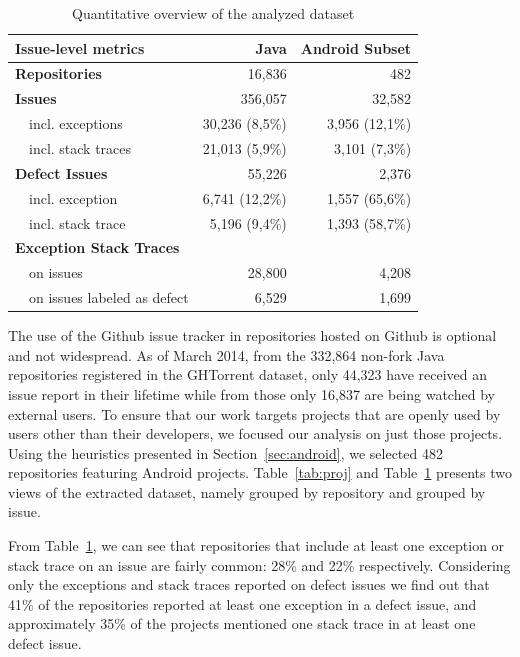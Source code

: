\documentclass[conference]{IEEEtran}
\begin{document}
\begin{table}
\centering
\begin{tabular}{p{1em}lrr}
\hline
\multicolumn{2}{l}{\bfseries{Issue-level metrics}} & \bfseries{Java} & \bfseries{Android Subset}\\
\hline
   \multicolumn{2}{l}{\bfseries{Repositories}} & 16,836 & 482\\
 \multicolumn{2}{l}{\bfseries{Issues}} & 356,057 & 32,582\\
    & incl. exceptions & 30,236 (8,5\%) & 3,956 (12,1\%) \\
    & incl. stack traces & 21,013 (5,9\%) & 3,101 (7,3\%) \\
 \multicolumn{2}{l}{\bfseries{Defect Issues}} & 55,226 & 2,376 \\  
    & incl. exception & 6,741 (12,2\%) & 1,557 (65,6\%) \\
    & incl. stack trace &  5,196 (9,4\%) & 1,393 (58,7\%)\\
\multicolumn{2}{l}{\bfseries{Exception Stack Traces}} &  & \\
    & on issues  & 28,800 & 4,208  \\
    & on issues labeled as defect & 6,529 & 1,699 \\
\hline
\end{tabular}
\caption{Quantitative overview of the analyzed dataset}
\label{tab:overview}
\end{table}

The use of the Github issue tracker in repositories hosted on Github is optional
and not widespread. As of March 2014, from the 332,864 non-fork Java repositories registered in the 
GHTorrent dataset, only 44,323 have received an issue report in their lifetime while from those only 16,837 are being watched by external users. To ensure that our work targets projects that are openly used by 
users other than their developers, we focused our analysis on just those
projects. Using the heuristics presented in Section~\ref{sec:android}, 
we selected 482 repositories featuring Android projects. Table~\ref{tab:proj} and 
Table~\ref{tab:overview} presents two views of the extracted dataset,
namely grouped by repository and grouped by issue.

From Table~\ref{tab:overview}, we can see that repositories that include at least one exception or stack trace on an issue 
are fairly common: 28\% and 22\%  respectively. Considering only the exceptions and stack traces reported on defect issues we find out that 41\% of the repositories reported at least one exception in a defect issue, and approximately 35\% of the projects mentioned one stack trace in at least one defect issue.
\end{document}
